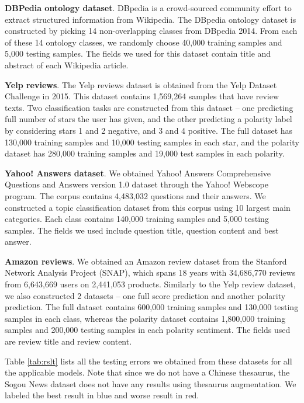 \documentclass{article} %
\begin{document}
\textbf{DBPedia ontology dataset}. DBpedia is a crowd-sourced community effort to extract structured information from Wikipedia\cite{LIJJKMHMKAB114}. The DBpedia ontology dataset is constructed by picking 14 non-overlapping classes from DBpedia 2014. From each of these 14 ontology classes, we randomly choose 40,000 training samples and 5,000 testing samples. The fields we used for this dataset contain title and abstract of each Wikipedia article.

\textbf{Yelp reviews}. The Yelp reviews dataset is obtained from the Yelp Dataset Challenge in 2015. This dataset contains 1,569,264 samples that have review texts. Two classification tasks are constructed from this dataset -- one predicting full number of stars the user has given, and the other predicting a polarity label by considering stars 1 and 2 negative, and 3 and 4 positive. The full dataset has 130,000 training samples and 10,000 testing samples in each star, and the polarity dataset has 280,000 training samples and 19,000 test samples in each polarity.

\textbf{Yahoo! Answers dataset}. We obtained Yahoo! Answers Comprehensive Questions and Answers version 1.0 dataset through the Yahoo! Webscope program. The corpus contains 4,483,032 questions and their answers. We constructed a topic classification dataset from this corpus using 10 largest main categories. Each class contains 140,000 training samples and 5,000 testing samples. The fields we used include question title, question content and best answer.

\textbf{Amazon reviews}. We obtained an Amazon review dataset from the Stanford Network Analysis Project (SNAP), which spans 18 years with 34,686,770 reviews from 6,643,669 users on 2,441,053 products\cite{ML13}. Similarly to the Yelp review dataset, we also constructed 2 datasets -- one full score prediction and another polarity prediction. The full dataset contains 600,000 training samples and 130,000 testing samples in each class, whereas the polarity dataset contains 1,800,000 training samples and 200,000 testing samples in each polarity sentiment. The fields used are review title and review content.

Table \ref{tab:rslt} lists all the testing errors we obtained from these datasets for all the applicable models. Note that since we do not have a Chinese thesaurus, the Sogou News dataset does not have any results using thesaurus augmentation. We labeled the best result in blue and worse result in red.
\end{document}
